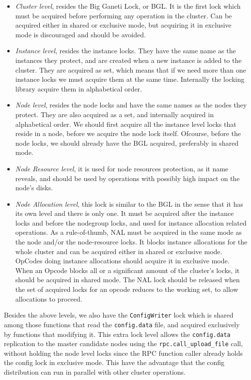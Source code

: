 \begin{description}
    \begin{itemize}
      \item \emph{Cluster level}, resides the Big Ganeti Lock, or BGL. It is the
        first lock which must be acquired before performing any operation in the
        cluster. Can be acquired either in shared or exclusive mode, but
        acquiring it in exclusive mode is discouraged and should be avoided.
      \item \emph{Instance level}, resides the instance locks. They have the
        same name as the instances they protect, and are created when a new
        instance is added to the cluster. They are acquired as set, which means
        that if we need more than one instance locks we must acquire them at the
        same time. Internally the locking library acquire them in alphabetical
        order.
      \item \emph{Node level}, resides the node locks and have the same names as
        the nodes they protect. They are also
        acquired as a set, and internally acquired in alphabetical order. We
        should first acquire all the instance level locks that reside in a node,
        before we acquire the node lock itself. Ofcourse, before the node locks,
        we should already have the BGL acquired, preferably in shared mode.
      \item \emph{Node Resource level}, it is used for node resources protection,
        as it name reveals, and should be used by operations with possibly high
        impact on the node's disks.
      \item \emph{Node Allocation level}, this lock is similar to the BGL in the
        sense that it has its own level and there is only one. It must be acquired
        after the instance locks and before the nodegroup locks, and used for
        instance allocation related operations. As a rule-of-thumb, NAL must be
        acquired in the same mode as the node and/or the node-resource locks. It
        blocks instance allocations for the whole cluster and can be acquired
        either in shared or exclusive mode. OpCodes doing instance allocations should
        acquire it in exclusive mode. When an Opcode blocks all or a significant
        amount of the cluster's locks, it should be acquired in shared mode. The
        NAL lock should be released when the set of acquired locks for an opcode
        reduces to the working set, to allow allocations to proceed.
    \end{itemize}

    Besides the above levels, we also have the \texttt{ConfigWriter} lock which is
    shared among those functions that read the \texttt{config.data} file, and
    acquired exclusively by functions that modifying it. This extra lock level allows
    the \texttt{config.data} replication to the master candidate nodes using the
    \texttt{rpc.call\_upload\_file} call, without holding the node level locks since
    the RPC function caller already holds the config lock in exclusive mode. This
    have the advantage that the config distribution can run in parallel with other
    cluster operations.


\end{description}
